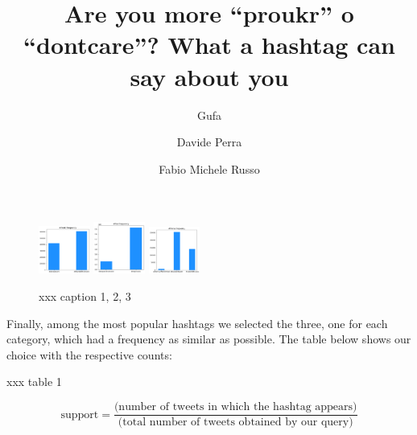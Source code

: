 \documentclass[sigchi]{acmart}
\begin{document}
\title{Are you more “proukr” o “dontcare”? 
What a hashtag can say about you}

\author{Gufa}

\author{Davide Perra}

\author{Fabio Michele Russo}

\renewcommand{\shortauthors}{Diamanti, Perra, Russo}

\maketitle


\begin{figure}[h]
\caption{xxx caption 1, 2, 3}
\centering
\includegraphics[width=0.15\textwidth]{intro_11}
\includegraphics[width=0.15\textwidth]{intro_12}
\includegraphics[width=0.15\textwidth]{intro_13}
\end{figure}

Finally, among the most popular hashtags we selected the three, one for each category, which had a frequency as similar as possible. The table below shows our choice with the respective counts:

xxx table 1


$$\text{support} = \frac{\text{(number of tweets in which the hashtag appears)}}{\text{(total number of tweets obtained by our query)}}$$
\end{document}
